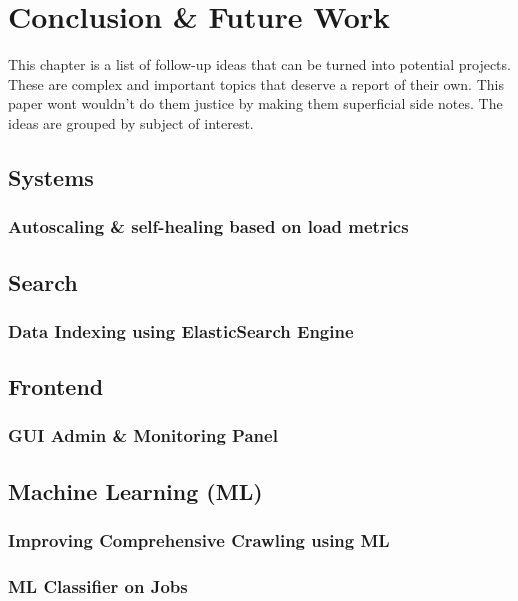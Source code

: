 \chapter{Conclusion \& Future Work}
This chapter is a list of follow-up ideas that can be turned into potential projects. These are complex and
important topics that deserve a report of their own. This paper wont wouldn't do them justice by making
them superficial side notes. The ideas are grouped by subject of interest.

\section{Systems}
\subsection{Autoscaling \& self-healing based on load metrics}

\section{Search}
\subsection{Data Indexing using ElasticSearch Engine}

\section{Frontend}
\subsection{GUI Admin \& Monitoring Panel}

\section{Machine Learning (ML)}
\subsection{Improving Comprehensive Crawling using ML}
\subsection{ML Classifier on Jobs}

\pagebreak